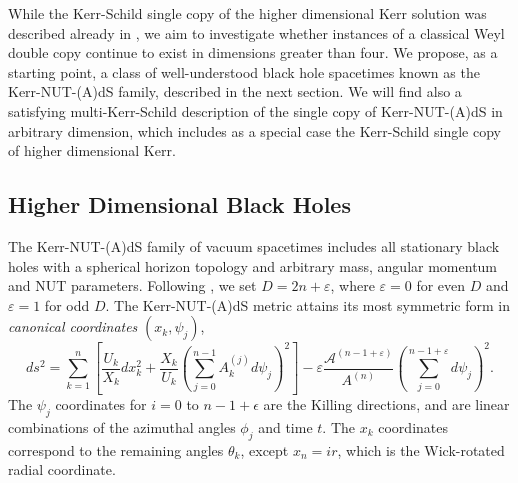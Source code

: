 While the Kerr-Schild single copy of the higher dimensional Kerr solution was described already in
\cite{Monteiro:2014cda}, we aim to investigate whether instances of a classical Weyl double copy continue to exist
in dimensions greater than four. We propose, as a starting point, a class of well-understood black hole spacetimes
known as the Kerr-NUT-(A)dS family, described in the next section. We will find also a satisfying multi-Kerr-Schild
description of the single copy of Kerr-NUT-(A)dS in arbitrary dimension, which includes as a special case the
Kerr-Schild single copy of higher dimensional Kerr.

\subsection{Higher Dimensional Black Holes}

The Kerr-NUT-(A)dS family of vacuum spacetimes includes all stationary black holes with a spherical horizon topology
and arbitrary mass, angular momentum and NUT parameters.
%    
Following \cite{Frolov:2017kze}, we set $D = 2n + \varepsilon$, where $\varepsilon = 0$
for even $D$ and $\varepsilon = 1$ for odd $D$. The Kerr-NUT-(A)dS metric attains its most
symmetric form in \emph{canonical
coordinates} $(x_{k}, \psi_{j})$,
%
\begin{equation} \label{5D:KNAmetricInCanonicalCoordinatesGeneralD} 
    ds^{2} = \sum_{k = 1}^{n} \left[ \frac{U_{k}}{X_{k}} dx_{k}^{2} +
    \frac{X_{k}}{U_{k}}\left( \sum_{j = 0}^{n-1} A_{k}^{(j)} d\psi_{j}\right)^{2}\right] -
    \varepsilon \frac{ \mathcal{A}^{(n - 1 + \varepsilon)}}{A^{(n)}}
    \left( \sum_{j = 0}^{n - 1 + \varepsilon} d\psi_{j}\right)^{2}.
\end{equation}
%
The $\psi_{j}$ coordinates for $i=0$ to $n-1+\epsilon$ are the Killing directions, and are linear combinations of
the azimuthal angles $\phi_{j}$ and time $t$. The $x_{k}$ coordinates correspond to the remaining angles
$\theta_{k}$, except $x_{n} = ir$, which is the Wick-rotated radial coordinate.

